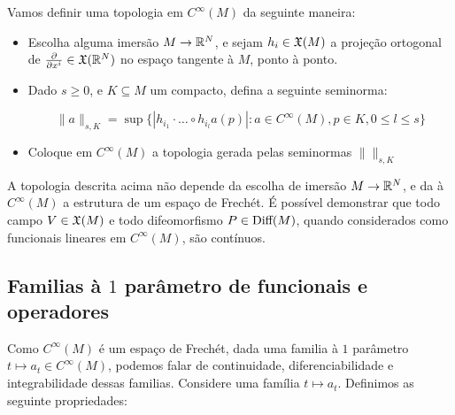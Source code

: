 Vamos definir uma topologia em $C^\infty(M)$ da seguinte maneira:

\begin{itemize}
    \item Escolha alguma imersão
    $M \to \mathbb{R}^N$, e sejam $h_i \in \mathfrak{X}(M)$ a projeção
    ortogonal de $\frac{\partial }{\partial x^i} \in \mathfrak{X}(\mathbb{R}^N)$ no espaço
    tangente à $M$, ponto à ponto.

    \item Dado $s \geq 0$, e $K \subseteq M$ um compacto, defina a seguinte seminorma:
    
    $$\|a\|_{s,K} = \sup\{|h_{i_1} \cdot \dots \circ h_{i_l} a (p)| :
    a \in C^\infty(M), p \in K, 0 \leq l \leq s\}$$

    \item Coloque em $C^\infty(M)$ a topologia gerada pelas seminormas
    $\|\|_{s,K}$
\end{itemize}

A topologia descrita acima não depende da escolha de imersão $M \to \mathbb{R}^N$,
e da à $C^\infty(M)$ a estrutura de um espaço de Frechét. É possível demonstrar
que todo campo $V \in \mathfrak{X}(M)$ e todo difeomorfismo $P \in \text{Diff}(M)$,
quando considerados como funcionais lineares em $C^\infty(M)$, são
contínuos.

\subsection{Familias à $1$ parâmetro de funcionais e operadores}

Como $C^\infty(M)$ é um espaço de Frechét,
dada uma familia à $1$ parâmetro $t \mapsto a_t \in C^\infty(M)$,
podemos falar de continuidade, diferenciabilidade e integrabilidade
dessas familias. Considere uma família $t \mapsto a_t$. Definimos
as seguinte propriedades:

